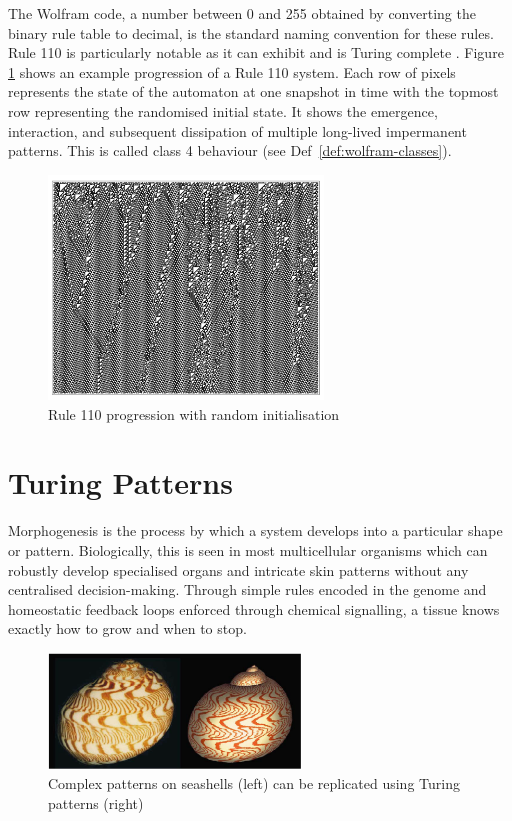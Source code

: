 The Wolfram code, a number between 0 and 255 obtained by converting the binary rule table to decimal, is the standard naming convention for these rules. Rule 110 is particularly notable as it can exhibit  and is Turing complete \cite{cook2004universality}. Figure \ref{fig:rule-110} shows an example progression of a Rule 110 system. Each row of pixels represents the state of the automaton at one snapshot in time with the topmost row representing the randomised initial state. It shows the emergence, interaction, and subsequent dissipation of multiple long-lived impermanent patterns. This is called class 4 behaviour\cite{wolfram2002} (see Def~\ref{def:wolfram-classes}).

\begin{figure}[!h]
\centering
\includegraphics[width=0.65\textwidth]{images/rule-110.png}
\caption{Rule 110 progression with random initialisation \cite{wolfram2002}}
\label{fig:rule-110}
\end{figure}

\section{Turing Patterns}
Morphogenesis is the process by which a system develops into a particular shape or pattern.  Biologically, this is seen in most multicellular organisms which can robustly develop specialised organs and intricate skin patterns without any centralised decision-making. Through simple rules encoded in the genome and homeostatic feedback loops enforced through chemical signalling, a tissue knows exactly how to grow and when to stop.

\begin{figure}[H]
\centering
\includegraphics[width=0.6\textwidth]{images/turing-shell.png}
\caption{Complex patterns on seashells (left) can be replicated using Turing patterns (right) \cite{meinhardt2009algorithmic}}
\label{fig:seashells}
\end{figure}

